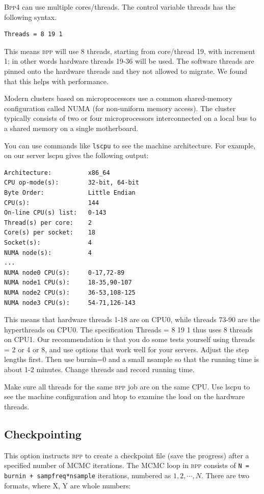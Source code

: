 \documentclass{book}
\numberwithin{equation}{section} \renewcommand{\baselinestretch}{0.55}
\begin{document}
\textsc{Bpp4} can use multiple cores/threads.  The control variable
threads has the following syntax.
\begin{verbatim}
Threads = 8 19 1
\end{verbatim}
This means \textsc{bpp} will use 8 threads, starting from core/thread
19, with increment 1; in other words hardware threads 19-36 will be
used.  The software threads are pinned onto the hardware threads and
they not allowed to migrate.  We found that this helps with
performance.

Modern clusters based on microprocessors use a common shared-memory
configuration called NUMA (for non-uniform memory access).  The
cluster typically consists of two or four microprocessors
interconnected on a local bus to a shared memory on a single
motherboard.

You can use commands like \texttt{lscpu} to see the machine
architecture.  For example, on our server lscpu gives the following
output:

\begin{verbatim}
Architecture:          x86_64
CPU op-mode(s):        32-bit, 64-bit
Byte Order:            Little Endian
CPU(s):                144
On-line CPU(s) list:   0-143
Thread(s) per core:    2
Core(s) per socket:    18
Socket(s):             4
NUMA node(s):          4
...
NUMA node0 CPU(s):     0-17,72-89
NUMA node1 CPU(s):     18-35,90-107
NUMA node2 CPU(s):     36-53,108-125
NUMA node3 CPU(s):     54-71,126-143
\end{verbatim}
This means that hardware threads 1-18 are on CPU0, while threads 73-90
are the hyperthreads on CPU0.  The specification Threads = 8 19 1 thus
uses 8 threads on CPU1.  Our recommendation is that you do some tests
yourself using threads = 2 or 4 or 8, and use options that work well
for your servers.  Adjust the step lengths first.  Then use burnin=0
and a small nsample so that the running time is about 1-2 minutes.
Change threads and record running time.

Make sure all threads for the same \textsc{bpp} job are on the same
CPU.  Use lscpu to see the machine configuration and htop to examine
the load on the hardware threads.


\subsection{Checkpointing}

This option instructs \textsc{bpp} to create a checkpoint file (save
the progress) after a specified number of MCMC iterations.  The MCMC
loop in \textsc{bpp} consists of \texttt{N = burnin +
  sampfreq*nsample} iterations, numbered as $1,2,\cdots,N$.  There are
two formats, where X, Y are whole numbers:
\end{document}
